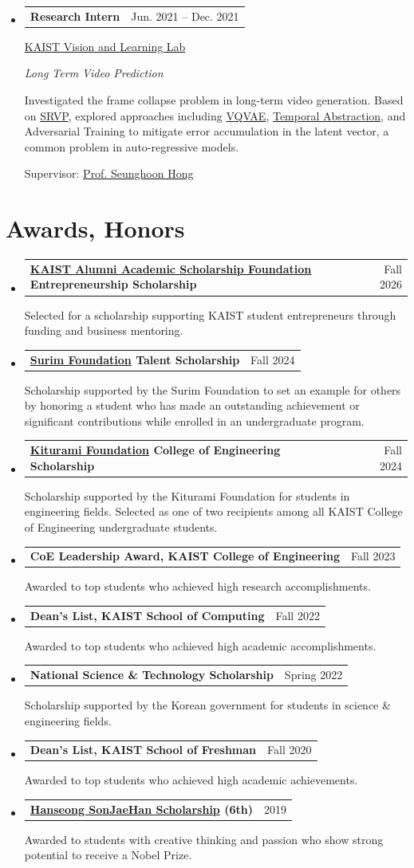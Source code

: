 \documentclass[10pt,a4paper]{article}
\makeatletter
\newenvironment{cvlist}{%
  \begin{itemize}[leftmargin=0pt,label={},itemsep=9pt,
    topsep=0pt,parsep=0pt,partopsep=0pt]%
}{\end{itemize}}
\newcommand{\entryhead}[2]{%
  \Needspace{4\baselineskip}%
  \item\begin{tabularx}{\linewidth}[t]{@{}>{\raggedright\arraybackslash}X@{\hspace{1em}}r@{}}%
    \textbf{#2} & {\small\color{muted}#1}\\
  \end{tabularx}\par\nobreak%
}
\newcommand{\entrytopic}[1]{%
  {\itshape #1\par}\nobreak%
}
\newcommand{\entrymeta}[1]{%
  {\small\color{muted}#1\par}\nobreak\vspace{1pt}%
}
\newcommand{\experienceentry}[5]{%
  \entryhead{#1}{#2}%
  \entrymeta{#3}%
  \if\relax\detokenize{#4}\relax\else\entrytopic{#4}\fi%
  #5\par%
}
\newcommand{\link}[2]{\href{#1}{#2}}
\makeatother
\begin{document}
\begin{cvlist}
  \experienceentry{Jun. 2021 -- Dec. 2021}{Research Intern}
    {\link{https://vllab.kaist.ac.kr/members.php}{KAIST Vision and Learning Lab}}
    {Long Term Video Prediction}
    {Investigated the frame collapse problem in long-term video generation. Based on \link{https://arxiv.org/abs/2002.09219}{SRVP}, explored approaches including \link{https://arxiv.org/abs/1711.00937}{VQVAE}, \link{https://arxiv.org/abs/1910.00775}{Temporal Abstraction}, and Adversarial Training to mitigate error accumulation in the latent vector, a common problem in auto-regressive models.\par
    \entrymeta{Supervisor: \link{https://maga33.github.io/}{Prof. Seunghoon Hong}}}
\end{cvlist}

\clearpage
\section{Awards, Honors}
\begin{cvlist}
  \entryhead{Fall 2026}{\link{https://kaistasf.or.kr/post/1077}{KAIST Alumni Academic Scholarship Foundation} Entrepreneurship Scholarship}
  Selected for a scholarship supporting KAIST student entrepreneurs through funding and business mentoring.

  \entryhead{Fall 2024}{\link{https://www.surim.or.kr/kr/talent/winner01.php}{Surim Foundation} Talent Scholarship}
  Scholarship supported by the Surim Foundation to set an example for others by honoring a student who has made an outstanding achievement or significant contributions while enrolled in an undergraduate program.

  \entryhead{Fall 2024}{\link{https://kiturami.co.kr/en/m31.php}{Kiturami Foundation} College of Engineering Scholarship}
  Scholarship supported by the Kiturami Foundation for students in engineering fields. Selected as one of two recipients among all KAIST College of Engineering undergraduate students.

  \entryhead{Fall 2023}{CoE Leadership Award, KAIST College of Engineering}
  Awarded to top students who achieved high research accomplishments.

  \entryhead{Fall 2022}{Dean's List, KAIST School of Computing}
  Awarded to top students who achieved high academic accomplishments.

  \entryhead{Spring 2022}{National Science \& Technology Scholarship}
  Scholarship supported by the Korean government for students in science \& engineering fields.

  \entryhead{Fall 2020}{Dean's List, KAIST School of Freshman}
  Awarded to top students who achieved high academic achievements.

  \entryhead{2019}{\link{https://www.sonjaehan.com/}{Hanseong SonJaeHan Scholarship} (6th)}
  Awarded to students with creative thinking and passion who show strong potential to receive a Nobel Prize.
\end{cvlist}
\end{document}
